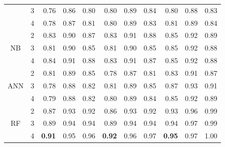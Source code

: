 \documentclass[12pt]{article}
\begin{document}
\begin{table}[H]
{\begin{tabular}{lrrrrrrrrrr}
            \multicolumn{1}{c}{} & \multicolumn{1}{c}{3} & 0.76 & 0.86 & \multicolumn{1}{c}{0.80} & 0.80 & 0.89 & \multicolumn{1}{c}{0.84}& 0.80 & 0.88 & \multicolumn{1}{c}{0.83}  \\
            \multicolumn{1}{c}{} & \multicolumn{1}{c}{4} & 0.78 & 0.87 & \multicolumn{1}{c}{0.81} & 0.80 & 0.89 & \multicolumn{1}{c}{0.83} & 0.81 & 0.89 & \multicolumn{1}{c}{0.84}  \\
            \hline
            \multicolumn{1}{c}{\multirow{3}{*}{NB}} & \multicolumn{1}{c}{2} & 0.83 & 0.90 & \multicolumn{1}{c}{0.87} & 0.83 & 0.91 & \multicolumn{1}{c}{0.88}& 0.85 & 0.92 & \multicolumn{1}{c}{0.89}  \\
            \multicolumn{1}{c}{} & \multicolumn{1}{c}{3} & 0.81 & 0.90 & \multicolumn{1}{c}{0.85} & 0.81 & 0.90 & \multicolumn{1}{c}{0.85} & 0.85 & 0.92 & \multicolumn{1}{c}{0.88}  \\
            \multicolumn{1}{c}{} & \multicolumn{1}{c}{4} & 0.84 & 0.91 & \multicolumn{1}{c}{0.88} & 0.83 & 0.91 & \multicolumn{1}{c}{0.87} & 0.85 & 0.92 & \multicolumn{1}{c}{0.88} \\
            \hline
            \multicolumn{1}{c}{\multirow{3}{*}{ANN}} & \multicolumn{1}{c}{2} & 0.81 & 0.89 & \multicolumn{1}{c}{0.85} & 0.78 & 0.87 & \multicolumn{1}{c}{0.81} & 0.83 & 0.91 & \multicolumn{1}{c}{0.87}  \\
            \multicolumn{1}{c}{} & \multicolumn{1}{c}{3} &  0.78 & 0.88 & \multicolumn{1}{c}{0.82} & 0.81 & 0.89 & \multicolumn{1}{c}{0.85} & 0.87 & 0.93 & \multicolumn{1}{c}{0.91}  \\
            \multicolumn{1}{c}{} & \multicolumn{1}{c}{4} & 0.79 & 0.88 & \multicolumn{1}{c}{0.82} & 0.80 & 0.89 & \multicolumn{1}{c}{0.84} & 0.85 & 0.92 & \multicolumn{1}{c}{0.89}  \\
            \hline
            \multicolumn{1}{c}{\multirow{3}{*}{RF}} & \multicolumn{1}{c}{2} & 0.87 & 0.93 & \multicolumn{1}{c}{0.92} & 0.86 & 0.93 & \multicolumn{1}{c}{0.92} & 0.93 & 0.96 & \multicolumn{1}{c}{0.99}  \\
            \multicolumn{1}{c}{} & \multicolumn{1}{c}{3} & 0.89 & 0.94 & \multicolumn{1}{c}{0.94} & 0.89 & 0.94 & \multicolumn{1}{c}{0.94} & 0.94 & 0.97 & \multicolumn{1}{c}{0.99} \\
            \multicolumn{1}{c}{} & \multicolumn{1}{c}{4} & \textbf{0.91} & 0.95 & \multicolumn{1}{c}{0.96} & \textbf{0.92} & 0.96 & \multicolumn{1}{c}{0.97} & \textbf{0.95} & 0.97 & \multicolumn{1}{c}{1.00} \\

\end{tabular}}
\end{table}
\end{document}
